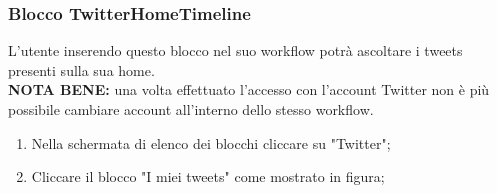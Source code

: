 \subsubsection{Blocco TwitterHomeTimeline} \label{twitterHo}
L'utente inserendo questo blocco nel suo workflow potrà ascoltare i tweets presenti sulla sua home. \\
\textbf{NOTA BENE:} una volta effettuato l'accesso con l'account Twitter non è più possibile cambiare account all'interno dello stesso workflow.
\newpage
\begin{enumerate}
	\item Nella schermata di elenco dei blocchi cliccare su "Twitter";
	\item Cliccare il blocco "I miei tweets" come mostrato in figura;
	\begin{figure}[!ht]
		\centering

\end{figure}
\end{enumerate}
